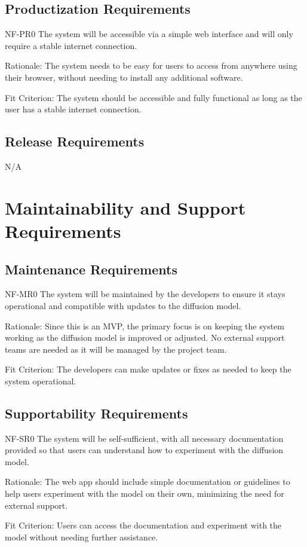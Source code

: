 \documentclass[12pt]{article}
\begin{document}
\subsection{Productization Requirements}
NF-PR0 The system will be accessible via a simple web interface and will only require a stable 
internet connection.

Rationale: The system needs to be easy for users to access from anywhere using their browser, 
without needing to install any additional software.

Fit Criterion: The system should be accessible and fully functional as long as the user has a 
stable internet connection.

\subsection{Release Requirements}
N/A

\section{Maintainability and Support Requirements}
\subsection{Maintenance Requirements}
NF-MR0 The system will be maintained by the developers to ensure it stays operational and 
compatible with updates to the diffusion model.

Rationale: Since this is an MVP, the primary focus is on keeping the system working as the 
diffusion model is improved or adjusted. No external support teams are needed as it will be 
managed by the project team.

Fit Criterion: The developers can make updates or fixes as needed to keep the system operational.

\subsection{Supportability Requirements}
NF-SR0 The system will be self-sufficient, with all necessary documentation provided so that users 
can understand how to experiment with the diffusion model.

Rationale: The web app should include simple documentation or guidelines to help users experiment
 with the model on their own, minimizing the need for external support.

Fit Criterion: Users can access the documentation and experiment with the model without needing 
further assistance.
\end{document}
